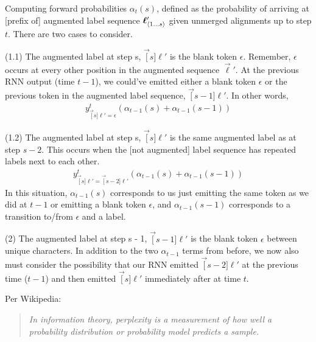 \documentclass[11pt]{article}
\begin{document}
\p Computing forward probabilities $\alpha_t(s)$, defined as the probability of arriving at [prefix of] augmented label sequence $\slice[s]{\ell}'$ given unmerged alignments up to step $t$. There are two cases to consider.
\begin{compactenum}
	\item  (1.1) The augmented label at step s, $\vec[s]{\ell}'$ is the blank token $\epsilon$. Remember, $\epsilon$ occurs at every other position in the augmented sequence $\vec{\ell}'$. At the previous RNN output (time $t - 1$), we could've emitted either a blank token $\epsilon$ or the previous token in the augmented label sequence, $\vec[s - 1]{\ell}'$. In other words, 
	\begin{align}
		y_{ \vec[s]{\ell}'{=}\epsilon}^t \left(   \alpha_{t - 1}(s) + \alpha_{t - 1}(s - 1)   \right)
	\end{align}
	
	\item (1.2) The augmented label at step s, $\vec[s]{\ell}'$ is the same augmented label as at step $s - 2$. This occurs when the [not augmented] label sequence has repeated labels next to each other. 
		\begin{align}
			y_{ \vec[s]{\ell}'{=} \vec[s-2]{\ell}' }^t \left(   \alpha_{t - 1}(s) + \alpha_{t - 1}(s - 1)   \right)
		\end{align}
		In this situation, $\alpha_{t-1}(s)$ corresponds to us just emitting the same token as we did at $t - 1$ or emitting a blank token $\epsilon$, and $\alpha_{t-1}(s - 1)$ corresponds to a transition to/from $\epsilon$ and a label. 
		
	\item (2)  The augmented label at step s - 1, $\vec[s - 1]{\ell}'$ is the blank token $\epsilon$ between unique characters. In addition to the two $\alpha_{t-1}$ terms from before, we now also must consider the possibility that our RNN emitted $\vec[s-2]{\ell}'$ at the previous time ($t-1$) and then emitted $\vec[s]{\ell}'$ immediately after at time $t$.  
\end{compactenum}

\myspace
{}
\myspace

Per Wikipedia:
\begin{quote}
	\vspace{-1em}
	\small\itshape
	In information theory, perplexity is a measurement of how well a probability distribution or probability model predicts a sample.
\end{quote}
\end{document}
